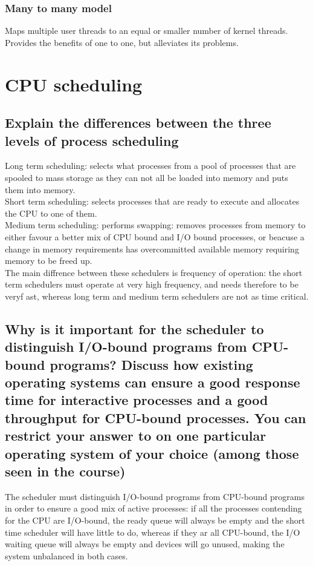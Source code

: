 \documentclass{article}
\begin{document}
\subsubsection{Many to many model}
Maps multiple user threads to an equal or smaller number of kernel threads. Provides the benefits of one to one, but alleviates its problems.

\section{CPU scheduling}

\subsection{Explain the differences between the three levels of process scheduling}
Long term scheduling: selects what processes from a pool of processes that are spooled to mass storage as they can not all be loaded into memory and puts them into memory.\\
Short term scheduling: selects processes that are ready to execute and allocates the CPU to one of them.\\
Medium term scheduling: performs swapping: removes processes from memory to either favour a better mix of CPU bound and I/O bound processes, or beacuse a change in memory requirements has overcommitted available memory requiring memory to be freed up.\\
The main diffrence between these schedulers is frequency of operation: the short term schedulers must operate at very high frequency, and needs therefore to be veryf ast, whereas long term and medium term schedulers are not as time critical.

\subsection{Why is it important for the scheduler to distinguish I/O-bound programs from CPU-bound programs? Discuss how existing operating systems can ensure a good response time for interactive processes and a good throughput for CPU-bound processes. You can restrict your answer to on one particular operating system of your choice (among those seen in the course)}
The scheduler must distinguish I/O-bound programs from CPU-bound programs in order to ensure a good mix of active processes: if all the processes contending for the CPU are I/O-bound, the ready queue will always be empty and the short time scheduler will have little to do, whereas if they ar all CPU-bound, the I/O waiting queue will always be empty and devices will go unused, making the system unbalanced in both cases.
\end{document}
